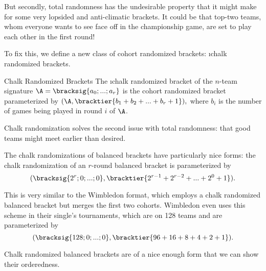 {    But secondly, total randomness has the undesirable property that it might make for some very lopsided and anti-climatic brackets. It could be that top-two teams, whom everyone wants to see face off in the championship game, are set to play each other in the first round!

    To fix this, we define a new class of cohort randomized brackets: \i{chalk randomized brackets}.

    \begin{definition}{Chalk Randomized Brackets}{}
        The \i{chalk randomized bracket} of the $n$-team signature $\A = \bracksig{a_0; ...; a_r}$ is the cohort randomized bracket parameterized by $(\A, \bracktier{b_1 + b_2 + ... + b_r + 1}),$ where $b_i$ is the number of games being played in round $i$ of $\A$.
    \end{definition}

    Chalk randomization solves the second issue with total randomness: that good teams might meet earlier than desired.


    The chalk randomizations of balanced brackets have particularly nice forms: the chalk randomization of an $r$-round balanced bracket is parameterized by $$(\bracksig{2^r; 0; ...; 0}, \bracktier{2^{r-1} + 2^{r-2} + ... + 2^{0} + 1}).$$

    This is very similar to the Wimbledon format, which employs a chalk randomized balanced bracket but merges the first two cohorts. Wimbledon even uses this scheme in their single's tournaments, which are on 128 teams and are parameterized by $$(\bracksig{128; 0; ...; 0}, \bracktier{96 + 16 + 8 + 4 + 2 + 1}).$$

    Chalk randomized balanced brackets are of a nice enough form that we can show their orderedness.

}
